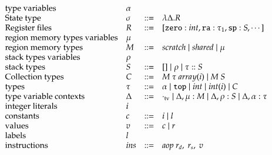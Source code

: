\begin{equation*}
    \begin{array}{llcl}
        \text{type variables}           & \alpha \\
        \text{State type}       & \sigma & ::= & \lambda \Delta.R \\
        \text{Register files}   & R     & ::= & [
                                                    \texttt{zero} : int,
                                                    \texttt{ra} : \tau_1,
                                                    \texttt{sp} : S,
                                                    \cdots
                                                ] \\
        \text{region memory types variables} & \mu \\
        \text{region memory types}      & M     & ::= & scratch \mid shared \mid \mu \\
        \text{stack types variables}    & \rho  & & \\
        \text{stack types}              & S     & ::= & [] \mid \rho \mid \tau :: S \\
        \text{Collection types}         & C     & ::= & M\ \tau\ array(i)
                                                    \mid M\ S
                                                    \\
        \text{types}                    & \tau  & ::= & \alpha
                                                    \mid \ttop
                                                    \mid int
                                                    \mid int(i)
                                                    \mid C
                                                    \\
        \text{type variable contexts}   & \Delta & ::= &
                                    \emptytv
                                    \mid \Delta, \mu : M
                                    \mid \Delta, \rho : S
                                    \mid \Delta, \alpha : \tau
                                    \\
        \text{integer literals}         & i \\
        \text{constants}                & c     & ::= & i \mid l \\
        \text{values}                   & v     & ::= & c \mid r \\
        \text{labels}                   & l \\
        \text{instructions}     & ins   & ::= & aop\ r_d,\ r_s,\ v \\

\end{array}
\end{equation*}
